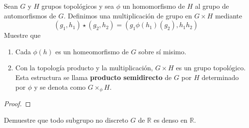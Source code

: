 \documentclass[12pt]{report}
\theoremstyle{largebreak}
\begin{document}
    \begin{excer}
        Sean $G$ y $H$ grupos topológicos y sea $\phi$ un homomorfismo de $H$ al grupo de automorfismos de $G$. Definimos una multiplicación de grupo en $G\times H$ mediante
        \begin{equation*}
            (g_1,h_1)\star(g_2,h_2)=(g_1\phi(h_1)(g_2),h_1h_2)
        \end{equation*}
        Muestre que
        \begin{enumerate}
            \item Cada $\phi(h)$ es un homeomorfismo de $G$ sobre sí misimo.
            \item Con la topología producto y la multiplicación, $G\times H$ es un grupo topológico. Esta estructura se llama \textbf{producto semidirecto} de $G$ por $H$ determinado por $\phi$ y se denota como $G\times_{\phi}H$.
        \end{enumerate}
    \end{excer}

    \begin{proof}
        
    \end{proof}

    \begin{excer}
        Demuestre que todo subgrupo no discreto $G$ de $\mathbb{R}$ es denso en $\mathbb{R}$.
    \end{excer}
\end{document}
